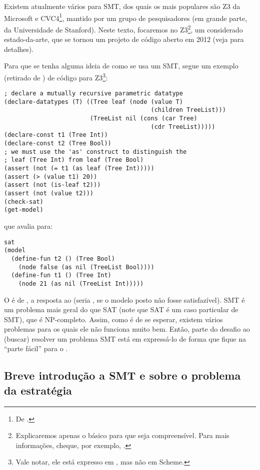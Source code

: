\documentclass{article}
\begin{document}
Existem atualmente vários  para SMT, dos quais os mais
populares são Z3 da Microsoft e CVC4\footnote{De
  .}, mantido por um grupo de
pesquisadores (em grande parte, da Universidade de Stanford). Neste
texto, focaremos no Z3\footnote{Explicaremos apenas o básico para que
  seja compreensível. Para mais informações, cheque, por exemplo,
  \cite{z3}.}, um  considerado
estado-da-arte, que se tornou um projeto de código aberto em 2012
(veja \cite{leo} para detalhes).

Para que se tenha alguma ideia de como se usa um  SMT,
segue um exemplo (retirado de \cite{tuto}) de código para
Z3\footnote{Vale notar, ele está expresso em , mas
  não em Scheme.}:

\begin{lstlisting}
; declare a mutually recursive parametric datatype
(declare-datatypes (T) ((Tree leaf (node (value T)
                                         (children TreeList)))
                        (TreeList nil (cons (car Tree)
                                         (cdr TreeList)))))
(declare-const t1 (Tree Int))
(declare-const t2 (Tree Bool))
; we must use the 'as' construct to distinguish the
; leaf (Tree Int) from leaf (Tree Bool)
(assert (not (= t1 (as leaf (Tree Int)))))
(assert (> (value t1) 20))
(assert (not (is-leaf t2)))
(assert (not (value t2)))
(check-sat)
(get-model)
\end{lstlisting}

\noindent que avalia para:

\begin{lstlisting}
sat
(model
  (define-fun t2 () (Tree Bool)
    (node false (as nil (TreeList Bool))))
  (define-fun t1 () (Tree Int)
    (node 21 (as nil (TreeList Int)))))
\end{lstlisting}

O  é de , a resposta ao
 (seria , se o modelo posto não
fosse satisfazível). SMT é um problema mais geral do que SAT (note
que SAT é um caso particular de SMT), que é
NP-completo. Assim, como é de se esperar, existem vários problemas
para os quais ele não funciona muito bem. Então, parte do desafio ao
(buscar) resolver um problema SMT está em expressá-lo de forma que
fique na ``parte fácil'' para o .

\subsection{Breve introdução a SMT e sobre o problema da estratégia}
\end{document}
